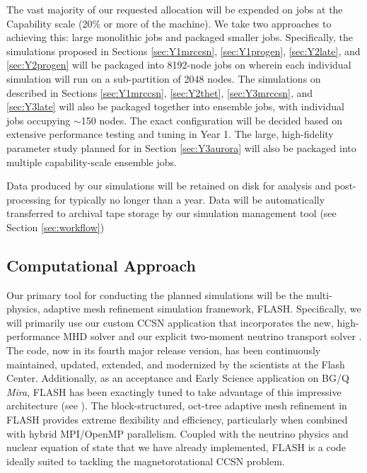 The vast majority of our requested allocation will be expended on jobs at the Capability scale (20\% or more of the machine).
We take two approaches to achieving this: large monolithic jobs and packaged smaller jobs.
Specifically, the simulations proposed in Sections \ref{sec:Y1mrccsn}, \ref{sec:Y1progen}, \ref{sec:Y2late}, and \ref{sec:Y2progen} will be packaged into 8192-node jobs on \mira wherein each individual simulation will run on a sub-partition of 2048 nodes.
The simulations on \thet described in Sections \ref{sec:Y1mrccsn}, \ref{sec:Y2thet}, \ref{sec:Y3mrccsn}, and \ref{sec:Y3late} will also be packaged together into ensemble jobs, with individual jobs occupying $\sim$150 nodes.
The exact configuration will be decided based on extensive performance testing and tuning in Year 1.
The large, high-fidelity parameter study planned for \aurora in Section \ref{sec:Y3aurora} will also be packaged into multiple capability-scale ensemble jobs.

Data produced by our simulations will be retained on disk for analysis and post-processing for typically no longer than a year.
Data will be automatically transferred to archival tape storage by our simulation management tool (see Section \ref{sec:workflow})

\subsection{Computational Approach}
\label{sec:approach}


Our primary tool for conducting the planned simulations will be the multi-physics, adaptive mesh refinement simulation framework, FLASH.
Specifically, we will primarily use our custom CCSN application \sparkmone that incorporates the new, high-performance \spark MHD solver \citep{Couch:2017} and our explicit two-moment neutrino transport solver \citep{OConnor:2015, OConnor:2015a}.
The code, now in its fourth major release version, has been continuously maintained, updated, extended, and modernized by the scientists at the Flash Center.
Additionally, as an acceptance and Early Science application on BG/Q {\it Mira}, FLASH has been exactingly tuned to take advantage of this impressive architecture (see \citet{Daley:2013esp}).
The block-structured, oct-tree adaptive mesh refinement in FLASH provides extreme flexibility and efficiency, particularly when combined with hybrid MPI/OpenMP parallelism.
Coupled with the neutrino physics and nuclear equation of state that we have already implemented, FLASH is a code ideally suited to tackling the magnetorotational CCSN problem.

